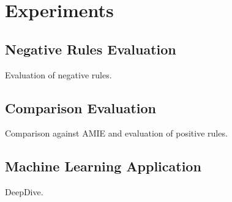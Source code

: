 \section{Experiments} \label{sec:experiment}

\subsection{Negative Rules Evaluation}
Evaluation of negative rules.

\subsection{Comparison Evaluation}
Comparison against AMIE and evaluation of positive rules.

\subsection{Machine Learning Application}
DeepDive.